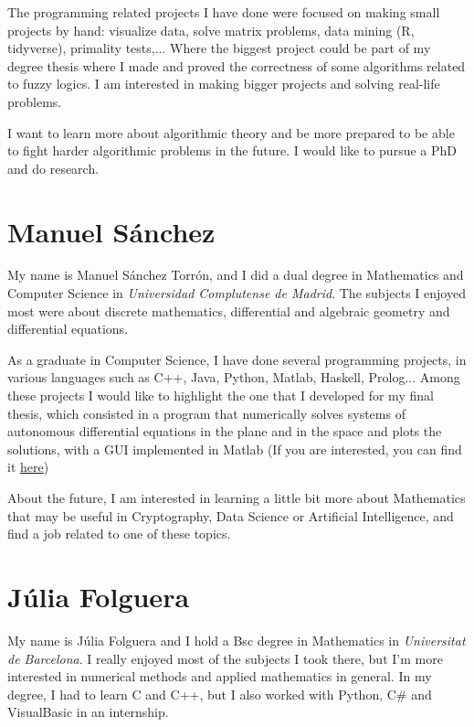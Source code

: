 \documentclass[11pt]{amsart}
\begin{document}
The programming related projects I have done were focused on making small projects by hand: visualize data, solve matrix problems, data mining (R, tidyverse),
primality tests,... Where the biggest project could be part of my degree thesis where I made and proved the correctness of some algorithms related to fuzzy logics.
I am interested in making bigger projects and solving real-life problems.

I want to learn more about algorithmic theory and be more prepared to be able to fight harder algorithmic problems in the future.  I would like to pursue a PhD and do research.


\medskip

\section*{Manuel Sánchez}

My name is Manuel Sánchez Torrón, and I did a dual degree in Mathematics and Computer Science in \textit{Universidad Complutense de Madrid}.
The subjects I enjoyed most were about discrete mathematics, differential and algebraic geometry and differential equations.

As a graduate in Computer Science, I have done several programming projects, in various languages such as C++, Java, Python, Matlab, Haskell, Prolog...
Among these projects I would like to highlight the one that I developed for my final thesis, which consisted in a program that numerically solves
systems of autonomous differential equations in the plane and in the space and plots the solutions, with a GUI implemented in Matlab 
(If you are interested, you can find it \href{https://github.com/ManuTorron5/TFG-app}{here})

About the future, I am interested in learning a little bit more about Mathematics that may be useful in Cryptography, Data Science or Artificial Intelligence,
and find a job related to one of these topics.


\section*{Júlia Folguera}

My name is Júlia Folguera and I hold a Bsc degree in Mathematics in \textit{Universitat de Barcelona}. I really enjoyed most of the subjects I took there,
but I'm more interested in numerical methods and applied mathematics in general. In my degree, I had to learn C and C++, but I also worked with Python, C\# and VisualBasic in an internship.
\end{document}
